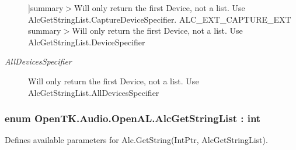 \begin{Desc}
\begin{description}
{}]summary$>$Will only return the first Device, not a list. Use Alc\-Get\-String\-List.\-Capture\-Device\-Specifier. A\-L\-C\-\_\-\-E\-X\-T\-\_\-\-C\-A\-P\-T\-U\-R\-E\-\_\-\-E\-X\-T summary$>$Will only return the first Device, not a list. Use Alc\-Get\-String\-List.\-Device\-Specifier\item[{\em 
\hypertarget{namespace_open_t_k_1_1_audio_1_1_open_a_l_a7ea538b81f9d8c91017cfd2f5794cd99a2333af1d27e1bb583ce1b0b23609dac5}{All\-Devices\-Specifier}\label{namespace_open_t_k_1_1_audio_1_1_open_a_l_a7ea538b81f9d8c91017cfd2f5794cd99a2333af1d27e1bb583ce1b0b23609dac5}
}]Will only return the first Device, not a list. Use Alc\-Get\-String\-List.\-All\-Devices\-Specifier\end{description}
\end{Desc}
\hypertarget{namespace_open_t_k_1_1_audio_1_1_open_a_l_ab48193b28204a15377a408d75aab408c}{
\subsubsection[{Alc\-Get\-String\-List}]{\setlength{\rightskip}{0pt plus 5cm}enum {\bf Open\-T\-K.\-Audio.\-Open\-A\-L.\-Alc\-Get\-String\-List} \-: int}}\label{namespace_open_t_k_1_1_audio_1_1_open_a_l_ab48193b28204a15377a408d75aab408c}


Defines available parameters for Alc.\-Get\-String(\-Int\-Ptr, Alc\-Get\-String\-List). 

